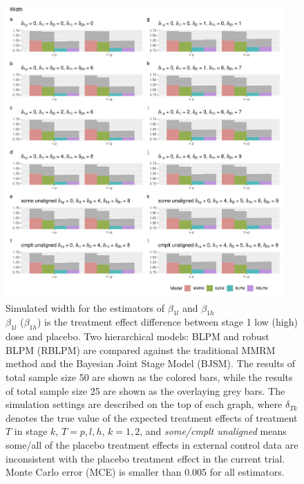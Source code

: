 \begin{figure}
\includegraphics[width=0.95\textwidth]{chapters/figures/Width_longitudinal.pdf}
\caption{Simulated width for the estimators of $\beta_{1l}$ and $\beta_{1h}$\label{fig:Width_longitudinal}\\$\beta_{1l}$ ($\beta_{1h}$) is the treatment effect difference between stage 1 low (high) dose and placebo. Two hierarchical models: BLPM and robust BLPM (RBLPM) are compared against the traditional MMRM method and the Bayesian Joint Stage Model (BJSM). The results of total sample size 50 are shown as the colored bars, while the results of total sample size 25 are shown as the overlaying grey bars. The simulation settings are described on the top of each graph, where $\delta_{Tk}$ denotes the true value of the expected treatment effects of treatment $T$ in stage $k$, $T = p, l, h$, $k = 1, 2$, and \emph{some/cmplt unaligned} means some/all of the placebo treatment effects in external control data are inconsistent with the placebo treatment effect in the current trial. Monte Carlo error (MCE) is smaller than 0.005 for all estimators.}
\end{figure}

